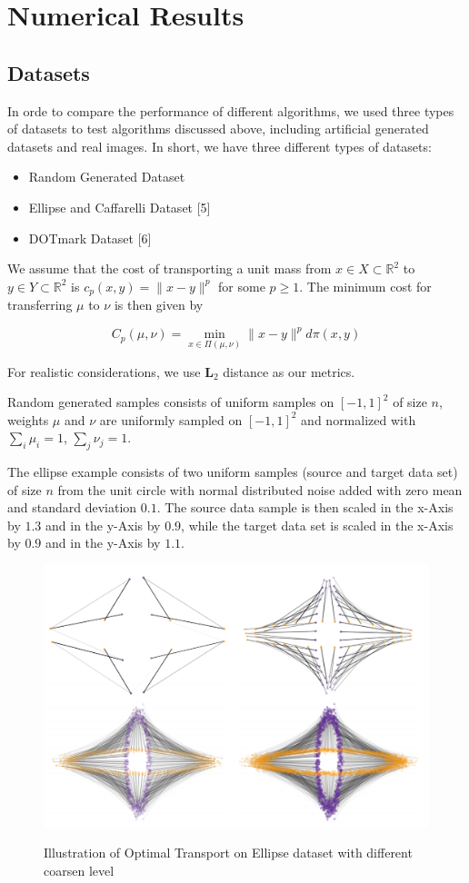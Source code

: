 
\section{Numerical Results}


\subsection{Datasets}
In orde to compare the performance of different algorithms, we used three types of datasets to test algorithms discussed above, including artificial generated datasets and real images. In short, we have three different types of datasets:
\begin{itemize}
    \item Random Generated Dataset
    \item Ellipse and Caffarelli Dataset [5]
    \item DOTmark Dataset [6]
\end{itemize}

We assume that the cost of transporting a unit mass from $x \in X \subset \mathbb{R}^2$ to $y \in Y \subset \mathbb{R}^2$ is $c_p(x,y) = \|x-y\|^p$ for some $p \geq 1$. The minimum cost for transferring $\mu$ to $\nu$ is then given by 

\begin{equation}
    C_p (\mu, \nu) = \min_{x \in \Pi(\mu,\nu)} \|x-y\|^p d\pi(x,y)
\end{equation}

For realistic considerations, we use $\mathbf{L}_2$ distance as our metrics.
  
Random generated samples consists of uniform samples on $[-1, 1]^2$ of size $n$, weights $\mu$ and $\nu$ are uniformly 
sampled on $[-1,1]^2$ and normalized with $\sum_i \mu_i = 1$, $\sum_j \nu_j = 1$.

The ellipse example consists of two uniform samples (source and target data set) of size $n$ from the unit circle
with normal distributed noise added with zero mean and standard deviation $0.1$. The source
data sample is then scaled in the x-Axis by $1.3$ and in the y-Axis by $0.9$, while the target
data set is scaled in the x-Axis by $0.9$ and in the y-Axis by $1.1$.

\begin{figure}[htbp]
    \centering
    \includegraphics[width=0.6\linewidth]{img/ellipse}
    \label{fig:ot}
    \caption{Illustration of Optimal Transport on Ellipse dataset with different coarsen level}
  \end{figure}

